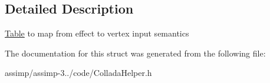 \subsection{Detailed Description}
\hyperlink{struct_table}{Table} to map from effect to vertex input semantics 

The documentation for this struct was generated from the following file\+:\begin{DoxyCompactItemize}
\item 
assimp/assimp-\/3../code/Collada\+Helper.\+h\end{DoxyCompactItemize}
